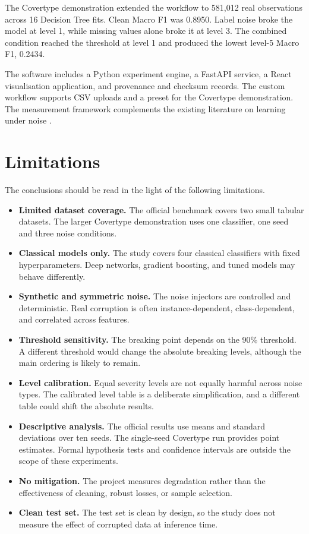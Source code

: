 The Covertype demonstration extended the workflow to 581,012 real observations across 16 Decision Tree fits. Clean Macro F1 was 0.8950. Label noise broke the model at level 1, while missing values alone broke it at level 3. The combined condition reached the threshold at level 1 and produced the lowest level-5 Macro F1, 0.2434.

The software includes a Python experiment engine, a FastAPI service, a React visualisation application, and provenance and checksum records. The custom workflow supports CSV uploads and a preset for the Covertype demonstration. The measurement framework complements the existing literature on learning under noise \cite{song2023survey,zeng2025feature,zhang2020hybrid,chen2023compound}.

\section{Limitations}

The conclusions should be read in the light of the following limitations.

\begin{itemize}
  \item \textbf{Limited dataset coverage.} The official benchmark covers two small tabular datasets. The larger Covertype demonstration uses one classifier, one seed and three noise conditions.
  \item \textbf{Classical models only.} The study covers four classical classifiers with fixed hyperparameters. Deep networks, gradient boosting, and tuned models may behave differently.
  \item \textbf{Synthetic and symmetric noise.} The noise injectors are controlled and deterministic. Real corruption is often instance-dependent, class-dependent, and correlated across features.
  \item \textbf{Threshold sensitivity.} The breaking point depends on the 90\% threshold. A different threshold would change the absolute breaking levels, although the main ordering is likely to remain.
  \item \textbf{Level calibration.} Equal severity levels are not equally harmful across noise types. The calibrated level table is a deliberate simplification, and a different table could shift the absolute results.
  \item \textbf{Descriptive analysis.} The official results use means and standard deviations over ten seeds. The single-seed Covertype run provides point estimates. Formal hypothesis tests and confidence intervals are outside the scope of these experiments.
  \item \textbf{No mitigation.} The project measures degradation rather than the effectiveness of cleaning, robust losses, or sample selection.
  \item \textbf{Clean test set.} The test set is clean by design, so the study does not measure the effect of corrupted data at inference time.
\end{itemize}

